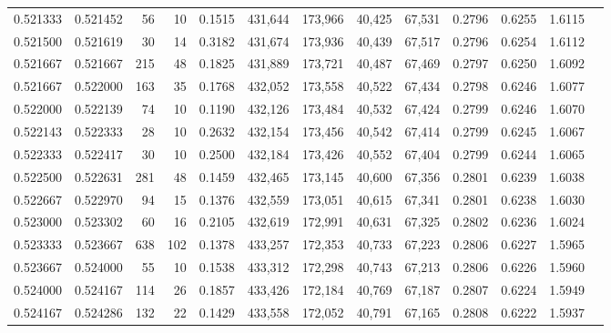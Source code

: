 \begin{tabular}{rrrrrrrrrrrrr}
0.521333 & 0.521452 &    56 &  10 &                                     0.1515 & 431,644 & 173,966 &  40,425 &  67,531 & 0.2796 & 0.6255 & 1.6115 \\
0.521500 & 0.521619 &    30 &  14 &                                     0.3182 & 431,674 & 173,936 &  40,439 &  67,517 & 0.2796 & 0.6254 & 1.6112 \\
0.521667 & 0.521667 &   215 &  48 &                                     0.1825 & 431,889 & 173,721 &  40,487 &  67,469 & 0.2797 & 0.6250 & 1.6092 \\
0.521667 & 0.522000 &   163 &  35 &                                     0.1768 & 432,052 & 173,558 &  40,522 &  67,434 & 0.2798 & 0.6246 & 1.6077 \\
0.522000 & 0.522139 &    74 &  10 &                                     0.1190 & 432,126 & 173,484 &  40,532 &  67,424 & 0.2799 & 0.6246 & 1.6070 \\
0.522143 & 0.522333 &    28 &  10 &                                     0.2632 & 432,154 & 173,456 &  40,542 &  67,414 & 0.2799 & 0.6245 & 1.6067 \\
0.522333 & 0.522417 &    30 &  10 &                                     0.2500 & 432,184 & 173,426 &  40,552 &  67,404 & 0.2799 & 0.6244 & 1.6065 \\
0.522500 & 0.522631 &   281 &  48 &                                     0.1459 & 432,465 & 173,145 &  40,600 &  67,356 & 0.2801 & 0.6239 & 1.6038 \\
0.522667 & 0.522970 &    94 &  15 &                                     0.1376 & 432,559 & 173,051 &  40,615 &  67,341 & 0.2801 & 0.6238 & 1.6030 \\
0.523000 & 0.523302 &    60 &  16 &                                     0.2105 & 432,619 & 172,991 &  40,631 &  67,325 & 0.2802 & 0.6236 & 1.6024 \\
0.523333 & 0.523667 &   638 & 102 &                                     0.1378 & 433,257 & 172,353 &  40,733 &  67,223 & 0.2806 & 0.6227 & 1.5965 \\
0.523667 & 0.524000 &    55 &  10 &                                     0.1538 & 433,312 & 172,298 &  40,743 &  67,213 & 0.2806 & 0.6226 & 1.5960 \\
0.524000 & 0.524167 &   114 &  26 &                                     0.1857 & 433,426 & 172,184 &  40,769 &  67,187 & 0.2807 & 0.6224 & 1.5949 \\
0.524167 & 0.524286 &   132 &  22 &                                     0.1429 & 433,558 & 172,052 &  40,791 &  67,165 & 0.2808 & 0.6222 & 1.5937 \\

\end{tabular}
